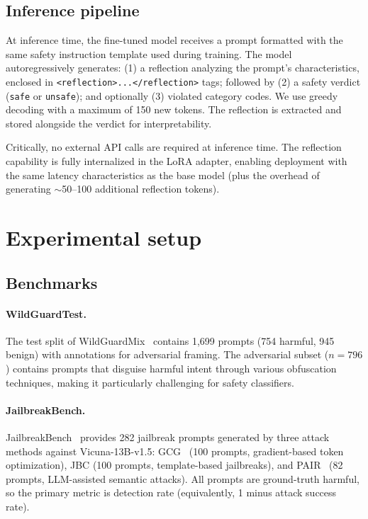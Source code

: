 \documentclass[11pt]{article}
\begin{document}
\subsection{Inference pipeline}

At inference time, the fine-tuned model receives a prompt formatted with the same safety instruction template used during training. The model autoregressively generates: (1) a reflection analyzing the prompt's characteristics, enclosed in \texttt{<reflection>...</reflection>} tags; followed by (2) a safety verdict (\texttt{safe} or \texttt{unsafe}); and optionally (3) violated category codes. We use greedy decoding with a maximum of 150 new tokens. The reflection is extracted and stored alongside the verdict for interpretability.

Critically, no external API calls are required at inference time. The reflection capability is fully internalized in the LoRA adapter, enabling deployment with the same latency characteristics as the base model (plus the overhead of generating $\sim$50--100 additional reflection tokens).

\section{Experimental setup}

\subsection{Benchmarks}

\paragraph{WildGuardTest.} The test split of WildGuardMix~\citep{han2024wildguard} contains 1{,}699 prompts (754 harmful, 945 benign) with annotations for adversarial framing. The adversarial subset ($n = 796$) contains prompts that disguise harmful intent through various obfuscation techniques, making it particularly challenging for safety classifiers.

\paragraph{JailbreakBench.} JailbreakBench~\citep{chao2024jailbreakbench} provides 282 jailbreak prompts generated by three attack methods against Vicuna-13B-v1.5: GCG~\citep{zou2023universal} (100 prompts, gradient-based token optimization), JBC (100 prompts, template-based jailbreaks), and PAIR~\citep{chao2023jailbreaking} (82 prompts, LLM-assisted semantic attacks). All prompts are ground-truth harmful, so the primary metric is detection rate (equivalently, 1 minus attack success rate).
\end{document}
